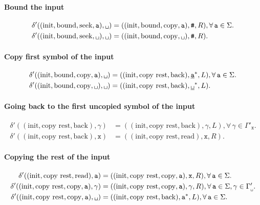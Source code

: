 \documentclass{article}
\newcommand{\obullet}[1]{\ensuremath{#1^*}}
\newcommand{\0}{\texttt{\textvisiblespace}}
\newcommand{\°}{\obullet{\0}}
\newcommand{\BB}{\obullet{\underline{\0}}}
\newcommand{\A}{\obullet{\s}}
\newcommand{\HA}{\obullet{\underline{\s}}}
\newcommand{\s}{\texttt{a}}
\newcommand{\X}{\texttt{x}}
\newcommand{\e}{\texttt{\#}}
\newcommand{\gpwb}{\Gamma'_{\0{}}}
\newcommand{\gpwx}{\Gamma'_{\X{}}}
\begin{document}
\paragraph{Bound the input}
\begin{align}
  \delta'((\text{init},\text{bound}, \text{seek}, \s), \0{})
  &= ((\text{init},\text{bound},\text{copy}, \s), \e, R),
  \forall\,\s\in\Sigma.\\
  \delta'((\text{init},\text{bound}, \text{seek}, \0{}), \0{})
  &= ((\text{init},\text{bound},\text{copy}, \0{}), \e, R).
\end{align}

\paragraph{Copy first symbol of the input}
\begin{align}
  \delta'((\text{init},\text{bound},\text{copy}, \s), \0{})
  &= ((\text{init},\text{copy rest},\text{back}), \HA, L),
  \forall\,\s \in \Sigma.\\
  \delta'((\text{init},\text{bound},\text{copy}, \0{}), \0{})
  &= ((\text{init},\text{copy rest},\text{back}), \BB, L).
\end{align}

\paragraph{Going back to the first uncopied symbol of the input}
\begin{align}
  \delta'((\text{init},\text{copy rest},\text{back}), \gamma)
  &= ((\text{init},\text{copy rest},\text{back}), \gamma, L),
  \forall\,
  \gamma \in \gpwx.\\
  \delta'((\text{init},\text{copy rest},\text{back}), \X)
  &= ((\text{init},\text{copy rest},\text{read}), \X, R).
\end{align}

\paragraph{Copying the rest of the input}
\begin{align}
  \delta'((\text{init},\text{copy rest},\text{read}), \s)
  &= ((\text{init}, \text{copy rest}, \text{copy}, \s), \X, R),
  \forall\,
  \s \in\Sigma.\\
  \delta'((\text{init}, \text{copy rest},\text{copy}, \s), \gamma)
  &= ((\text{init}, \text{copy rest},\text{copy}, \s), \gamma, R),
  \forall\,
  \s \in\Sigma,
  \gamma \in\gpwb.\\
  \delta'((\text{init}, \text{copy rest},\text{copy}, \s), \0{})
  &= ((\text{init},\text{copy rest},\text{back}), \A, L),
  \forall\,
  \s \in\Sigma.
\end{align}
\end{document}
